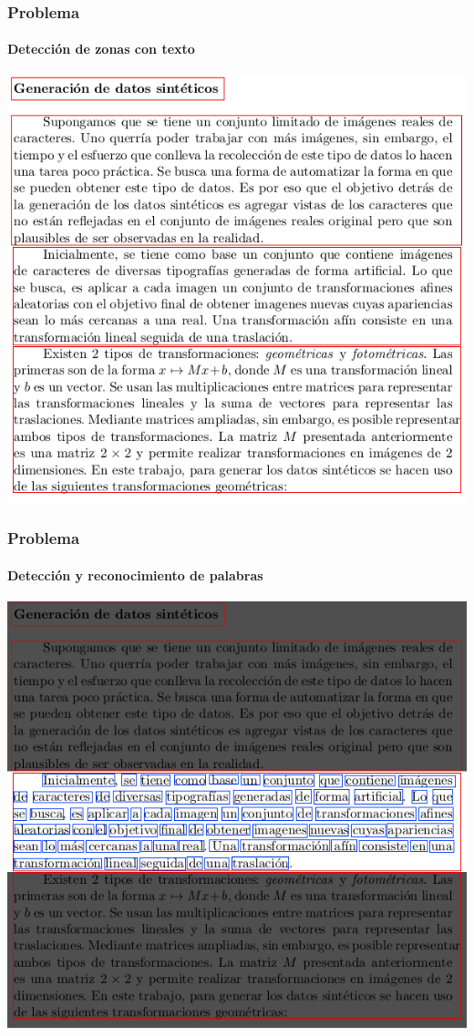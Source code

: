 		\begin{frame}
			\frametitle{Problema}
			\framesubtitle{Detección de zonas con texto}
			\begin{center}
				\includegraphics[height=0.65\paperheight]{imgs/texto_plano_det_texto.png}
			\end{center}
		\end{frame}
		\begin{frame}
			\frametitle{Problema}
			\framesubtitle{Detección y reconocimiento de palabras}
			\begin{center}
				\includegraphics[height=0.65\paperheight]{imgs/texto_plano_det_palabras.png}	
			\end{center}
		\end{frame}
